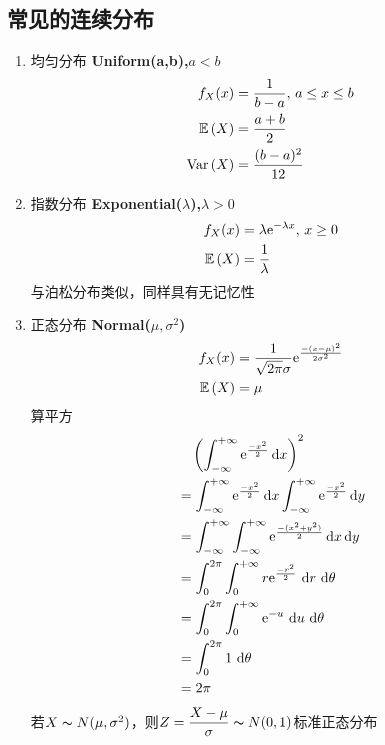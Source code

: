 \subsection{常见的连续分布}
\begin{enumerate}
	\item 均匀分布 \textbf{Uniform(a,b),$a<b$}
	\[\begin{aligned}
	f_X(x)&=\dfrac{1}{b-a},\,a\leq x\leq b\\
	\E{X}&=\dfrac{a+b}{2}\\
	\Var{X}&=\dfrac{(b-a)^2}{12}
	\end{aligned}\]
	\item 指数分布 \textbf{Exponential($\lambda$),$\lambda>0$}
	\[\begin{aligned}
	f_X(x)&=\lambda\ee^{-\lambda x},\,x\geq 0\\
	\E{X}&=\dfrac{1}{\lambda}
	\end{aligned}\]
	与泊松分布类似，同样具有无记忆性
	\item 正态分布 \textbf{Normal($\mu,\sigma^2$)}
	\[\begin{aligned}
	f_X(x)&=\dfrac{1}{\sqrt{2\pi}\sigma}\ee^\frac{-(x-\mu)^2}{2\sigma^2}\\
	\E{X}&=\mu
	\end{aligned}\]
	算平方
	\[\begin{aligned}
	&\quad\left(\intinf{\ee^\frac{-x^2}{2}}\right)^2\\
	&=\intinf{\ee^\frac{-x^2}{2}}\intinf[y]{\ee^\frac{-x^2}{2}}\\
	&=\intinf[y]{\intinf{\ee^\frac{-(x^2+y^2)}{2}}}\\
	&=\intabu{0}{2\pi}{\intabu{0}{+\infty}{r\ee^\frac{-r^2}{2}}{r}}{\theta}\\
	&=\intabu{0}{2\pi}{\intabu{0}{+\infty}{\ee^{-u}}{u}}{\theta}\\
	&=\intabu{0}{2\pi}{1}{\theta}\\
	&=2\pi
	\end{aligned}\]
	若$X\thicksim N(\mu,\sigma^2)$，则$Z=\dfrac{X-\mu}{\sigma}\thicksim N(0,1)$标准正态分布
\end{enumerate}